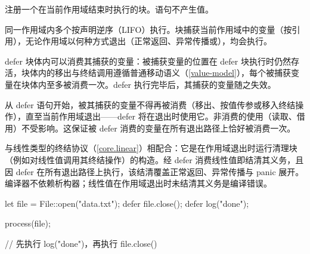 \pnum
{}注册一个在当前作用域结束时执行的块。语句不产生值。

\pnum
同一作用域内多个按声明逆序（LIFO）执行。块捕获当前作用域中的变量（按引用），无论作用域以何种方式退出（正常返回、异常传播或），均会执行。

\pnum
defer 块体内可以消费其捕获的变量：被捕获变量的位置在 defer 块执行时仍然存活，块体内的移出与终结调用遵循普通移动语义（\ref{value-model}），每个被捕获变量在块体内至多被消费一次。defer 执行完毕后，其捕获的变量随之失效。

\pnum
从 defer 语句开始，被其捕获的变量不得再被消费（移出、按值传参或移入终结操作），直至当前作用域退出——defer 将在退出时使用它。非消费的使用（读取、借用）不受影响。这保证被 defer 消费的变量在所有退出路径上恰好被消费一次。

\pnum
{}与线性类型的终结协议（\ref{core.linear}）相配合：它是在作用域退出时运行清理块（例如对线性值调用其终结操作）的构造。经 defer 消费线性值即结清其义务，且因 defer 在所有退出路径上执行，该结清覆盖正常返回、异常传播与 panic 展开。编译器不依赖析构器；线性值在作用域退出时未结清其义务是编译错误。

\enterexample
\begin{codeblock}
{
    let file = File::open("data.txt");
    defer { file.close(); }
    defer { log("done"); }

    process(file);
}
// 先执行 log("done")，再执行 file.close()
\end{codeblock}
\exitexample
